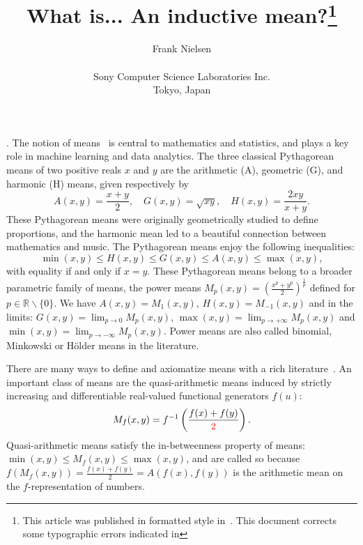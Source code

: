 \documentclass{article}
\def\correction#1{{\color{red}{#1}}}
\def\bbR{\mathbb{R}}
\begin{document}
\title{What is... An inductive mean?\thanks{This article was published in formatted style in~\cite{whatis-2023}. This document corrects some typographic errors indicated in \correction{red}}}

\author{Frank Nielsen\\ \ \\ Sony Computer Science Laboratories Inc.\\ Tokyo, Japan}

\date{}

\maketitle

. 
The notion of means~\cite{de2016mean} is central to mathematics and statistics, and  plays a key role in machine learning and data analytics.  
The three classical Pythagorean means of two positive reals $x$ and $y$ are the arithmetic  (A), geometric  (G), 
and  harmonic (H) means, given respectively by
$$
A(x,y) = \frac{x+y}{2},\quad
G(x,y) = \sqrt{xy},\quad
H(x,y) = \frac{2xy}{x+y}.
$$
These  Pythagorean means were originally geometrically studied to define proportions, and the harmonic mean 
led to a beautiful connection between mathematics and music.
The Pythagorean means enjoy the following inequalities:
$$
\min(x,y)\leq H(x,y)\leq G(x,y)\leq A(x,y)\leq \max(x,y),
$$
with equality if and only if $x=y$.
These Pythagorean means belong to a broader parametric family of means, the power means $M_p(x,y)=\left(\frac{x^p+y^p}{2}\right)^\frac{1}{p}$ 
defined for $p\in\bbR\backslash\{0\}$.
We have $A(x,y)=M_1(x,y)$, $H(x,y)=M_{-1}(x,y)$ and in the limits: $G(x,y)=\lim_{p\rightarrow 0} M_p(x,y)$, 
$\max(x,y)=\lim_{p\rightarrow+\infty} M_p(x,y)$ and 
$\min(x,y)=\lim_{p\rightarrow-\infty} M_p(x,y)$.
Power means are also called binomial, Minkowski or H\"older means in the literature.

There are many ways to define and axiomatize means with a rich literature~\cite{bullen2003handbook}.
An important class of means are the quasi-arithmetic means induced by strictly increasing and differentiable real-valued functional generators $f(u)$:
\begin{equation}\label{eq:qam}
M_f(x,y)=f^{-1}\left(\frac{f(x)+f(y)}{\correction{2}}\right).
\end{equation}
Quasi-arithmetic means satisfy the in-betweenness property of means: 
$\min(x,y)\leq M_f(x,y)\leq \max(x,y)$, and are called so because $f(M_f(x,y))=\frac{f(x)+f(y)}{2}=A(f(x),f(y))$ is the arithmetic mean on the $f$-representation of numbers.
\end{document}
